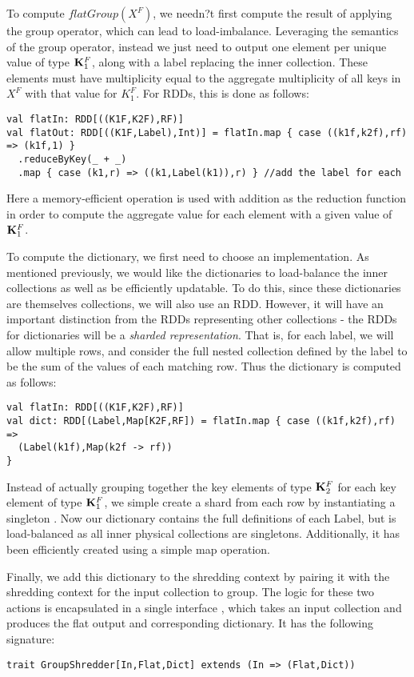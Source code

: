 To compute $flatGroup(X^F)$, we needn?t first compute the result of applying the group operator, which can lead to load-imbalance. Leveraging the semantics of the group operator, instead we just need to output one element per unique value of type $\mathbf{K}_1^F$, along with a label replacing the inner collection. These elements must have multiplicity equal to the aggregate multiplicity of all keys in $X^F$ with that value for $K_1^F$. For RDDs, this is done as follows:
\vs\begin{lstlisting}
val flatIn: RDD[((K1F,K2F),RF)]
val flatOut: RDD[((K1F,Label),Int)] = flatIn.map { case ((k1f,k2f),rf) => (k1f,1) }
  .reduceByKey(_ + _)
  .map { case (k1,r) => ((k1,Label(k1)),r) } //add the label for each
\end{lstlisting}\vs
Here a memory-efficient  operation is used with addition as the reduction function in order to compute the aggregate value for each element with a given value of $\mathbf{K}_1^F$.

To compute the dictionary, we first need to choose an implementation. As mentioned previously, we would like the dictionaries to load-balance the inner collections as well as be efficiently updatable. To do this, since these dictionaries are themselves collections, we will also use an RDD. However, it will have an important distinction from the RDDs representing other collections - the RDDs for dictionaries will be a \textit{sharded representation}. That is, for each label, we will allow multiple rows, and consider the full nested collection defined by the label to be the sum of the values of each matching row. Thus the dictionary is computed as follows:
\vs\begin{lstlisting}
val flatIn: RDD[((K1F,K2F),RF)]
val dict: RDD[(Label,Map[K2F,RF]) = flatIn.map { case ((k1f,k2f),rf) =>
  (Label(k1f),Map(k2f -> rf))
}
\end{lstlisting}\vs

Instead of actually grouping together the key elements of type $\mathbf{K}_2^F$ for each key element of type $\mathbf{K}_1^F$, we simple create a shard from each row by instantiating a singleton . Now our dictionary contains the full definitions of each Label, but is load-balanced as all inner physical collections are singletons. Additionally, it has been efficiently created using a simple map operation.

Finally, we add this dictionary to the shredding context by pairing it with the shredding context for the input collection to group. The logic for these two actions is encapsulated in a single interface , which takes an input collection and produces the flat output and corresponding dictionary. It has the following signature:
\vs\begin{lstlisting}
trait GroupShredder[In,Flat,Dict] extends (In => (Flat,Dict))
\end{lstlisting}\vs

